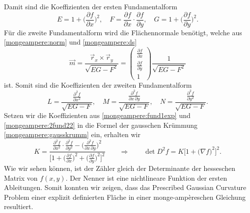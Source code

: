 Damit sind die Koeffizienten der ersten Fundamentalform 
\begin{equation}
  E = 1 + \biggl(\frac{\partial f}{\partial x}\biggr)^2, \quad
  F = \frac{\partial f}{\partial x} \cdot \frac{\partial f}{\partial y}, \quad
  G = 1 + \biggl(\frac{\partial f}{\partial y}\biggr)^2.
  \label{mongeampere:fund1exp}
\end{equation}
Für die zweite Fundamentalform wird die Flächennormale benötigt, welche aus \eqref{mongeampere:norm} und \eqref{mongeampere:ds} 
\begin{equation}
  \vec m = \frac{\vec r_x \times \vec r_y}{\sqrt{EG-F^2}} = \begin{pmatrix}
    \frac{\partial f}{\partial x} \\
    \frac{\partial f}{\partial y} \\
    1
  \end{pmatrix}
  \frac{1}{\sqrt{EG-F^2}}
  \label{mongeampere:norm2}
\end{equation}
ist.
Somit sind die Koeffizienten der zweiten Fundamentalform
\begin{equation}
  L = \frac{\displaystyle\frac{\partial^2 f}{\partial x^2}}{\sqrt{EG-F}}, \quad
  M = \frac{\displaystyle\frac{\partial^2 f}{\partial x \, \partial y}}{\sqrt{EG-F}}, \quad
  N = \frac{\displaystyle\frac{\partial^2 f}{\partial y^2}}{\sqrt{EG-F}}.
  \label{mongeampere:2fund22}
\end{equation}
Setzen wir die Koeffizienten aus \eqref{mongeampere:fund1exp} und \eqref{mongeampere:2fund22} in die Formel der gausschen Krümmung \eqref{mongeampere:gausskrumm}
ein, erhalten wir
\begin{equation}
  K = \frac{
    \displaystyle\frac{\partial^2 f}{\partial x^2} \cdot \displaystyle\frac{\partial^2 f}{\partial y^2} - \biggl(\displaystyle\frac{\partial^2 f}{\partial x \, \partial y} \biggr)^2}
    {\biggl[1 + 
    \biggl(\displaystyle\frac{\partial f}{\partial x}\biggr)^2 +
    \biggl(\displaystyle\frac{\partial f}{\partial y}\biggr)^2\biggr]^2}
\qquad\Rightarrow\qquad
    \det D^2 f = K \bigl[ 1 + 
    \bigl(\nabla f\bigr)^2\bigr]^2.
    \label{mongeampere:pd}
\end{equation}
Wie wir sehen können, ist der Zähler gleich der Determinante der hesseschen Matrix von $f(x,y)$.
Der Nenner ist eine nichtlineare Funktion der ersten Ableitungen.
Somit konnten wir zeigen, dass das Prescribed Gaussian Curvature Problem einer explizit definierten Fläche in einer 
monge-ampèreschen Gleichung resultiert.

